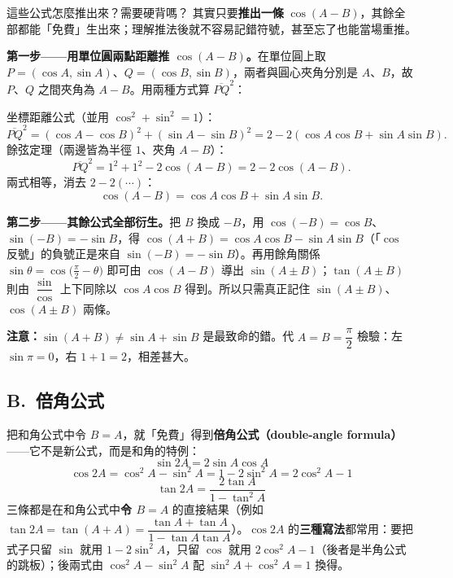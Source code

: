 \documentclass[11pt]{article}
\begin{document}
\begin{延伸框}{這些公式怎麼推出來？需要硬背嗎？}
其實只要\textbf{推出一條} $\cos(A-B)$，其餘全部都能「免費」生出來；理解推法後就不容易記錯符號，甚至忘了也能當場重推。

\textbf{第一步——用單位圓兩點距離推 $\cos(A-B)$。}在單位圓上取 $P=(\cos A,\sin A)$、$Q=(\cos B,\sin B)$，兩者與圓心夾角分別是 $A$、$B$，故 $P$、$Q$ 之間夾角為 $A-B$。用兩種方式算 $\overline{PQ}^2$：

坐標距離公式（並用 $\cos^2+\sin^2=1$）：
$$\overline{PQ}^2=(\cos A-\cos B)^2+(\sin A-\sin B)^2=2-2(\cos A\cos B+\sin A\sin B).$$
餘弦定理（兩邊皆為半徑 $1$、夾角 $A-B$）：
$$\overline{PQ}^2=1^2+1^2-2\cos(A-B)=2-2\cos(A-B).$$
兩式相等，消去 $2-2(\cdots)$：
$$\cos(A-B)=\cos A\cos B+\sin A\sin B.$$

\textbf{第二步——其餘公式全部衍生。}把 $B$ 換成 $-B$，用 $\cos(-B)=\cos B$、$\sin(-B)=-\sin B$，得 $\cos(A+B)=\cos A\cos B-\sin A\sin B$（「$\cos$ 反號」的負號正是來自 $\sin(-B)=-\sin B$）。再用餘角關係 $\sin\theta=\cos\!\big(\tfrac{\pi}{2}-\theta\big)$ 即可由 $\cos(A-B)$ 導出 $\sin(A\pm B)$；$\tan(A\pm B)$ 則由 $\dfrac{\sin}{\cos}$ 上下同除以 $\cos A\cos B$ 得到。所以只需真正記住 $\sin(A\pm B)$、$\cos(A\pm B)$ 兩條。

\textbf{注意：}$\sin(A+B)\neq\sin A+\sin B$ 是最致命的錯。代 $A=B=\dfrac{\pi}{2}$ 檢驗：左 $\sin\pi=0$，右 $1+1=2$，相差甚大。
\end{延伸框}


\subsection*{\sffamily B.\ 倍角公式}

把和角公式中令 $B=A$，就「免費」得到\textbf{倍角公式（double-angle formula）}——它不是新公式，而是和角的特例：
$$\boxed{\;\sin 2A=2\sin A\cos A\;}$$
$$\boxed{\;\cos 2A=\cos^2 A-\sin^2 A=1-2\sin^2 A=2\cos^2 A-1\;}$$
$$\boxed{\;\tan 2A=\frac{2\tan A}{1-\tan^2 A}\;}$$
三條都是在和角公式中\textbf{令 $B=A$} 的直接結果（例如 $\tan2A=\tan(A+A)=\dfrac{\tan A+\tan A}{1-\tan A\tan A}$）。$\cos 2A$ 的\textbf{三種寫法}都常用：要把式子只留 $\sin$ 就用 $1-2\sin^2A$，只留 $\cos$ 就用 $2\cos^2A-1$（後者是半角公式的跳板）；後兩式由 $\cos^2A-\sin^2A$ 配 $\sin^2A+\cos^2A=1$ 換得。
\end{document}
